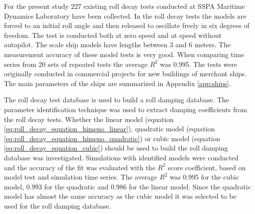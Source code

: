 For the present study 227 existing roll decay tests conducted at SSPA Maritime Dynamics Laboratory have been collected. In the roll decay tests the models are forced to an initial roll angle and then released to oscillate freely in six degrees of freedom. The test is conducted both at zero speed and at speed without autopilot. The scale ship models have lengths between 3 and 6 meters. The measurement accuracy of these model tests is very good. When comparing time series from 20 sets of repeated tests the average $R^2$ was 0.995. The tests were originally conducted in commercial projects for new buildings of merchant ships. The main parameters of the ships are summarized in Appendix \ref{app:ships}. 

The roll decay test database is used to build a roll damping database. The parameter identification technique was used to extract damping coefficients from the roll decay tests. Whether the linear model (equation \ref{eq:roll_decay_equation_himeno_linear}), quadratic model (equation \ref{eq:roll_decay_equation_himeno_quadratic}) or cubic model (equation \ref{eq:roll_decay_equation_cubic}) should be used to build the roll damping database was investigated. Simulations with identified models were conducted and the accuracy of the fit was evaluated with the $R^2$ score coefficient, based on model test and simulation time series.
The average $R^2$ was 0.995 for the cubic model, 0.993 for the quadratic and 0.986 for the linear model. Since the quadratic model has almost the same accuracy as the cubic model it was selected to be used for the roll damping database.
